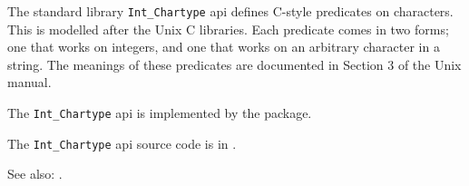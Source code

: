 
The standard library {\tt Int\_Chartype} api defines 
C-style predicates on characters.  This is modelled after the Unix C libraries.  
Each predicate comes in two forms; one that works on integers, and one 
that works on an arbitrary character in a string.  The meanings of these 
predicates are documented in Section 3 of the Unix manual. 

The {\tt Int\_Chartype} api is implemented by the  package.

The {\tt Int\_Chartype} api source code is in .

See also: .








